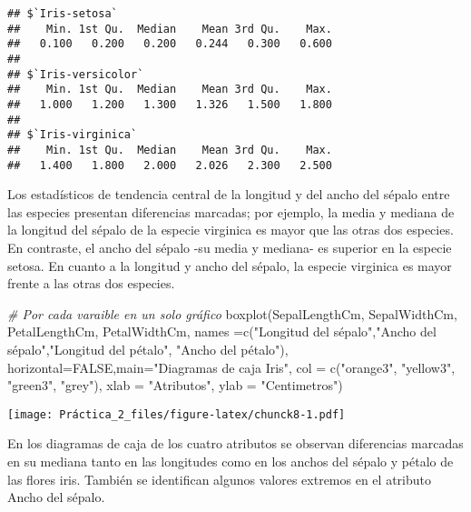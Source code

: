 \documentclass[
]{article}
\newenvironment{Shaded}{\begin{snugshade}}{\end{snugshade}}
\newcommand{\AttributeTok}[1]{\textcolor[rgb]{0.77,0.63,0.00}{#1}}
\newcommand{\CommentTok}[1]{\textcolor[rgb]{0.56,0.35,0.01}{\textit{#1}}}
\newcommand{\ConstantTok}[1]{\textcolor[rgb]{0.00,0.00,0.00}{#1}}
\newcommand{\FunctionTok}[1]{\textcolor[rgb]{0.00,0.00,0.00}{#1}}
\newcommand{\NormalTok}[1]{#1}
\newcommand{\StringTok}[1]{\textcolor[rgb]{0.31,0.60,0.02}{#1}}
\begin{document}
\begin{verbatim}
## $`Iris-setosa`
##    Min. 1st Qu.  Median    Mean 3rd Qu.    Max. 
##   0.100   0.200   0.200   0.244   0.300   0.600 
## 
## $`Iris-versicolor`
##    Min. 1st Qu.  Median    Mean 3rd Qu.    Max. 
##   1.000   1.200   1.300   1.326   1.500   1.800 
## 
## $`Iris-virginica`
##    Min. 1st Qu.  Median    Mean 3rd Qu.    Max. 
##   1.400   1.800   2.000   2.026   2.300   2.500
\end{verbatim}

Los estadísticos de tendencia central de la longitud y del ancho del
sépalo entre las especies presentan diferencias marcadas; por ejemplo,
la media y mediana de la longitud del sépalo de la especie virginica es
mayor que las otras dos especies. En contraste, el ancho del sépalo -su
media y mediana- es superior en la especie setosa. En cuanto a la
longitud y ancho del sépalo, la especie virginica es mayor frente a las
otras dos especies.

\begin{Shaded}
\begin{Highlighting}[]
\CommentTok{\# Por cada varaible en un solo gráfico}
\FunctionTok{boxplot}\NormalTok{(SepalLengthCm, SepalWidthCm, PetalLengthCm, PetalWidthCm,   }
        \AttributeTok{names =}\FunctionTok{c}\NormalTok{(}\StringTok{"Longitud del sépalo"}\NormalTok{,}\StringTok{"Ancho del sépalo"}\NormalTok{,}\StringTok{"Longitud del pétalo"}\NormalTok{,}
                \StringTok{"Ancho del pétalo"}\NormalTok{), }\AttributeTok{horizontal=}\ConstantTok{FALSE}\NormalTok{,}\AttributeTok{main=}\StringTok{"Diagramas de caja Iris"}\NormalTok{,}
        \AttributeTok{col =} \FunctionTok{c}\NormalTok{(}\StringTok{"orange3"}\NormalTok{, }\StringTok{"yellow3"}\NormalTok{, }\StringTok{"green3"}\NormalTok{, }\StringTok{"grey"}\NormalTok{),}
        \AttributeTok{xlab =} \StringTok{"Atributos"}\NormalTok{, }\AttributeTok{ylab =} \StringTok{"Centimetros"}\NormalTok{)}
\end{Highlighting}
\end{Shaded}

\texttt{[image: Práctica\_2\_files/figure-latex/chunck8-1.pdf]}

En los diagramas de caja de los cuatro atributos se observan diferencias
marcadas en su mediana tanto en las longitudes como en los anchos del
sépalo y pétalo de las flores iris. También se identifican algunos
valores extremos en el atributo Ancho del sépalo.
\end{document}
